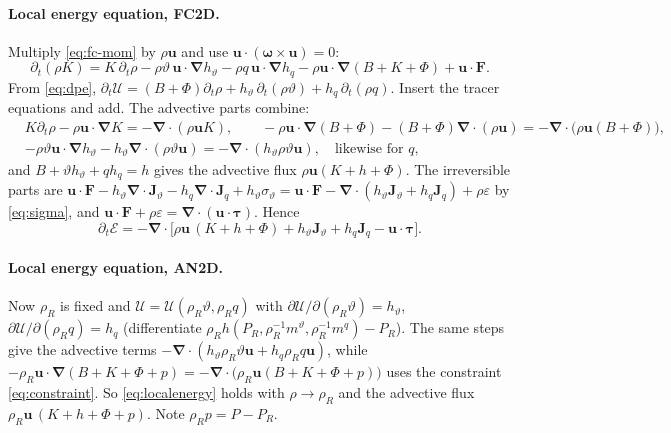 \documentclass[11pt,a4paper]{article}
\newcommand{\vt}{\vartheta}                    %
\newcommand{\hth}{{h_{\vartheta}}}               %
\newcommand{\hq}{{h_q}}                          %
\newcommand{\bu}{\mathbf{u}}
\newcommand{\bJ}{\mathbf{J}}
\newcommand{\bF}{\mathbf{F}}
\newcommand{\bnabla}{\boldsymbol{\nabla}}
\newcommand{\btau}{\boldsymbol{\tau}}
\newcommand{\bomega}{\boldsymbol{\omega}}
\begin{document}
\paragraph{Local energy equation, FC2D.} Multiply \eqref{eq:fc-mom} by $\rho\bu$ and use $\bu\cdot(\bomega\times\bu)=0$:
\begin{equation}
  \partial_t(\rho K)=K\,\partial_t\rho-\rho\vt\,\bu\!\cdot\!\bnabla\hth-\rho q\,\bu\!\cdot\!\bnabla\hq-\rho\bu\!\cdot\!\bnabla(B+K+\Phi)+\bu\!\cdot\!\bF .
\end{equation}
From \eqref{eq:dpe}, $\partial_t\mathcal U=(B+\Phi)\partial_t\rho+\hth\,\partial_t(\rho\vt)+\hq\,\partial_t(\rho q)$. Insert the tracer equations and add. The advective parts combine:
\begin{align}
  &K\partial_t\rho-\rho\bu\!\cdot\!\bnabla K=-\bnabla\!\cdot(\rho\bu K),\qquad
  -\rho\bu\!\cdot\!\bnabla(B+\Phi)-(B+\Phi)\bnabla\!\cdot(\rho\bu)=-\bnabla\!\cdot\big(\rho\bu(B+\Phi)\big),\nonumber\\
  &-\rho\vt\bu\!\cdot\!\bnabla\hth-\hth\bnabla\!\cdot(\rho\vt\bu)=-\bnabla\!\cdot(\hth\rho\vt\bu),\quad\text{likewise for }q,
\end{align}
and $B+\vt\hth+q\hq=h$ gives the advective flux $\rho\bu(K+h+\Phi)$. The irreversible parts are
$\bu\!\cdot\!\bF-\hth\bnabla\!\cdot\bJ_\vt-\hq\bnabla\!\cdot\bJ_q+\hth\sigma_\vt=\bu\!\cdot\!\bF-\bnabla\!\cdot(\hth\bJ_\vt+\hq\bJ_q)+\rho\varepsilon$ by \eqref{eq:sigma}, and $\bu\!\cdot\!\bF+\rho\varepsilon=\bnabla\!\cdot(\bu\cdot\btau)$. Hence
\begin{equation}
  \partial_t\mathcal E=-\bnabla\!\cdot\Big[\rho\bu\,(K+h+\Phi)+\hth\bJ_\vt+\hq\bJ_q-\bu\cdot\btau\Big] .
  \label{eq:localenergy}
\end{equation}
\paragraph{Local energy equation, AN2D.} Now $\rho_R$ is fixed and $\mathcal U=\mathcal U(\rho_R\vt,\rho_Rq)$ with $\partial\mathcal U/\partial(\rho_R\vt)=\hth$, $\partial\mathcal U/\partial(\rho_Rq)=\hq$ (differentiate $\rho_Rh(P_R,\rho_R^{-1}m^\vt,\rho_R^{-1}m^q)-P_R$). The same
steps give the advective terms $-\bnabla\!\cdot(\hth\rho_R\vt\bu+\hq\rho_Rq\bu)$, while $-\rho_R\bu\!\cdot\!\bnabla(B+K+\Phi+p)=-\bnabla\!\cdot\big(\rho_R\bu(B+K+\Phi+p)\big)$ uses the constraint \eqref{eq:constraint}.
So \eqref{eq:localenergy} holds with $\rho\to\rho_R$ and the advective flux $\rho_R\bu\,(K+h+\Phi+p)$. Note $\rho_Rp=P-P_R$.
\end{document}
